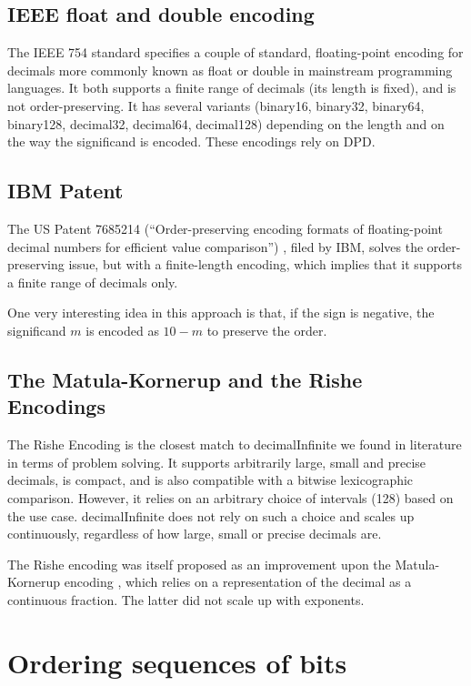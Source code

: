 \documentclass{acm_proc_article-sp}
\begin{document}
\vspace{100pt}
\subsection{IEEE float and double encoding}

The IEEE 754 standard specifies a couple of standard, floating-point encoding for decimals more commonly known as float or double in mainstream programming languages. It both supports a finite range of decimals (its length is fixed), and is not order-preserving. It has several variants (binary16, binary32, binary64, binary128, decimal32, decimal64, decimal128) depending on the length and on the way the significand is encoded. These encodings rely on DPD.

\subsection{IBM Patent}
The US Patent 7685214 (``Order-preserving encoding formats of floating-point decimal numbers for efficient value comparison'') , filed by IBM, solves the order-preserving issue, but with a finite-length encoding, which implies that it supports a finite range of decimals only.

One very interesting idea in this approach is that, if the sign is negative, the significand $m$ is encoded as $10-m$ to preserve the order.

\subsection{The Matula-Kornerup and the Rishe Encodings}
\label{section-rishe}

The Rishe Encoding \cite{Rishe1992} is the closest match to decimalInfinite we found in literature in terms of problem solving. It supports arbitrarily large, small and precise decimals, is compact, and is also compatible with a bitwise lexicographic comparison. However, it relies on an arbitrary choice of intervals (128) based on the use case. decimalInfinite does not rely on such a choice and scales up continuously, regardless of how large, small or precise decimals are.

The Rishe encoding was itself proposed as an improvement upon the Matula-Kornerup encoding \cite{Kornerup1983}, which relies on a representation of the decimal as a continuous fraction. The latter did not scale up with exponents.

\section{Ordering sequences of bits}
\label{section-ordering}
\end{document}
